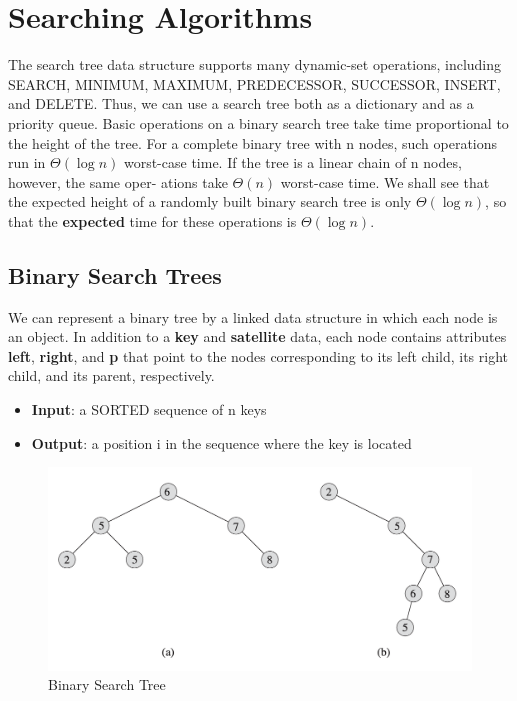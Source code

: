 


\chapter{Searching Algorithms}

The search tree data structure supports many dynamic-set operations, including
SEARCH, MINIMUM, MAXIMUM, PREDECESSOR, SUCCESSOR, INSERT, and
DELETE. Thus, we can use a search tree both as a dictionary and as a priority
queue.
Basic operations on a binary search tree take time proportional to the height of
the tree. For a complete binary tree with n nodes, such operations run in $\Theta(\log n)$
worst-case time. If the tree is a linear chain of n nodes, however, the same oper-
ations take $\Theta(n)$ worst-case time. We shall see that the expected height of a randomly
built binary search tree is only $\Theta(\log n)$, so that the \textbf{expected} time for these 
operations is $\Theta(\log n)$.


\section{Binary Search Trees}

We can represent a binary tree by a linked data structure in which each node is an object.
In addition to a \textbf{key} and \textbf{satellite} data, each node contains attributes \textbf{left}, \textbf{right}, and \textbf{p} that
point to the nodes corresponding to its left child, its right child, and its parent, respectively.

\begin{itemize}
    \item \textbf{Input}: a SORTED sequence of n keys 
    \item \textbf{Output}: a position i in the sequence where the key is located
\end{itemize}

\begin{figure}[H]
    \centering
    \includegraphics[width=\textwidth]{assets/binary_tree.png}
    \caption{Binary Search Tree}
\end{figure}

